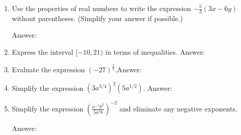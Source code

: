 \documentclass[11pt]{article}
\begin{document}
\begin{enumerate}
\item Use the properties of real numbers to write the expression $-\frac{5}{3}(3x-6y)$ without parentheses. (Simplify your answer if possible.)\\
\begin{flushright}{Answer: \underline{\hspace{2in}}}\end{flushright}

\vfill

\item Express the interval $[-10,21)$ in terms of inequalities. \hfill Answer: \underline{\hspace{2in}}
\vspace{1in}




\item Evaluate the expression $(-27)^{\frac{2}{3}}.$\hfill Answer: \underline{\hspace{2in}}\\
\vspace{0.5in}


\item Simplify the expression $ (3a^{3/4})^2(5a^{1/2}).$ \hfill Answer: \underline{\hspace{2in}}\\
\vspace{1in}


\item Simplify the expression $\left( \frac{a^{-1}b^2}{5a^2b}\right)^{-2}  $ and eliminate any negative exponents.\\
\begin{flushright}{Answer: \underline{\hspace{2in}}}\end{flushright}

\vfill
\newpage


\end{enumerate}
\end{document}
